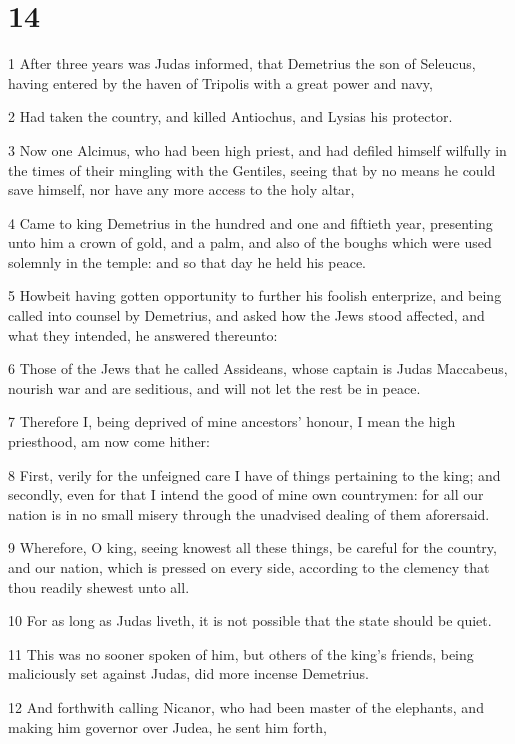 \chapter{14}

\par 1 After three years was Judas informed, that Demetrius the son of Seleucus, having entered by the haven of Tripolis with a great power and navy,
\par 2 Had taken the country, and killed Antiochus, and Lysias his protector.
\par 3 Now one Alcimus, who had been high priest, and had defiled himself wilfully in the times of their mingling with the Gentiles, seeing that by no means he could save himself, nor have any more access to the holy altar,
\par 4 Came to king Demetrius in the hundred and one and fiftieth year, presenting unto him a crown of gold, and a palm, and also of the boughs which were used solemnly in the temple: and so that day he held his peace.
\par 5 Howbeit having gotten opportunity to further his foolish enterprize, and being called into counsel by Demetrius, and asked how the Jews stood affected, and what they intended, he answered thereunto:
\par 6 Those of the Jews that he called Assideans, whose captain is Judas Maccabeus, nourish war and are seditious, and will not let the rest be in peace.
\par 7 Therefore I, being deprived of mine ancestors' honour, I mean the high priesthood, am now come hither:
\par 8 First, verily for the unfeigned care I have of things pertaining to the king; and secondly, even for that I intend the good of mine own countrymen: for all our nation is in no small misery through the unadvised dealing of them aforersaid.
\par 9 Wherefore, O king, seeing knowest all these things, be careful for the country, and our nation, which is pressed on every side, according to the clemency that thou readily shewest unto all.
\par 10 For as long as Judas liveth, it is not possible that the state should be quiet.
\par 11 This was no sooner spoken of him, but others of the king's friends, being maliciously set against Judas, did more incense Demetrius.
\par 12 And forthwith calling Nicanor, who had been master of the elephants, and making him governor over Judea, he sent him forth,
